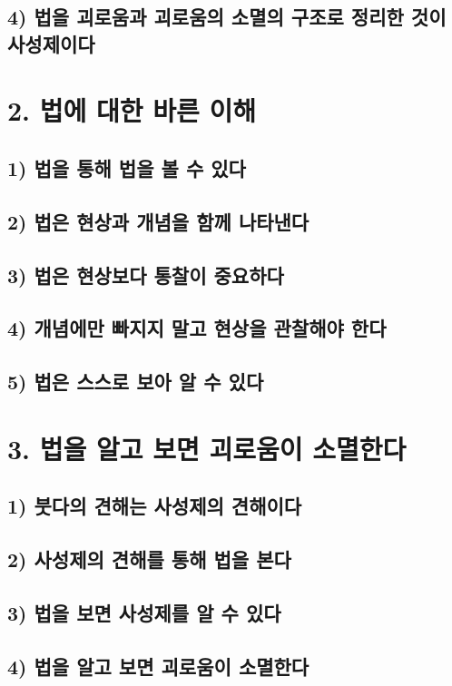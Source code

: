\documentclass[12pt, a4paper, oneside]{book}
\begin{document}
	\section{4) 법을 괴로움과 괴로움의 소멸의 구조로 정리한 것이 사성제이다}

	\newpage
	\chapter{2. 법에 대한 바른 이해}
	\section{1) 법을 통해 법을 볼 수 있다}
	\section{2) 법은 현상과 개념을 함께 나타낸다}
	\section{3) 법은 현상보다 통찰이 중요하다}
	\section{4) 개념에만 빠지지 말고 현상을 관찰해야 한다}
	\section{5) 법은 스스로 보아 알 수 있다}

	\newpage
	\chapter{3. 법을 알고 보면 괴로움이 소멸한다}
	\section{1) 붓다의 견해는 사성제의 견해이다}
	\section{2) 사성제의 견해를 통해 법을 본다}
	\section{3) 법을 보면 사성제를 알 수 있다}
	\section{4) 법을 알고 보면 괴로움이 소멸한다}
\end{document}
